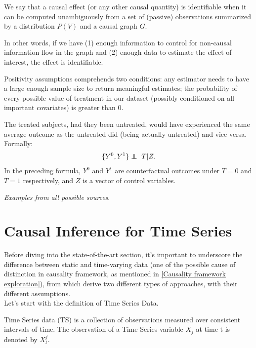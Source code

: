 \begin{definition}[Identifiability]
    We say that a causal effect (or any other causal quantity) is identifiable when it can be computed unambiguously from a set of (passive) observations summarized by a distribution $P(V)$ and a causal graph $G$.
\end{definition}
In other words, if we have (1) enough information to control for non-causal information flow in the graph and (2) enough data to estimate the effect of interest, the effect is identifiable.
\begin{definition}[Positivity]
    Positivity assumptions comprehends two conditions: any estimator needs to have a large enough sample size to return meaningful estimates; the probability of every possible value of treatment in our dataset (possibly conditioned on all important covariates) is greater than 0.
\end{definition}
\begin{definition}
    The treated subjects, had they been untreated, would have experienced the same average outcome as the untreated did (being actually untreated) and vice versa. Formally: $$\{ Y^0, Y^1 \} \independent \ T|Z.$$ In the preceding formula, $Y^0$ and $Y^1$ are counterfactual outcomes under $T = 0$ and $T = 1$ respectively, and $Z$ is a vector of control variables.
\end{definition}

\textit{Examples from all possible sources}.\\


\section{Causal Inference for Time Series}
Before diving into the state-of-the-art section, it's important to underscore the difference between static and time-varying data (one of the possible cause of distinction in causality framework, as mentioned in \ref{Causality framework exploration}), from which derive two different types of approaches, with their different assumptions.\\

Let's start with the definition of Time Series Data.

\begin{definition}
Time Series data (TS) is a collection of observations measured over consistent
intervals of time. The observation of a Time Series variable $X_{j}$ at time t is denoted by $X^j_{t}$.
\end{definition}\\


